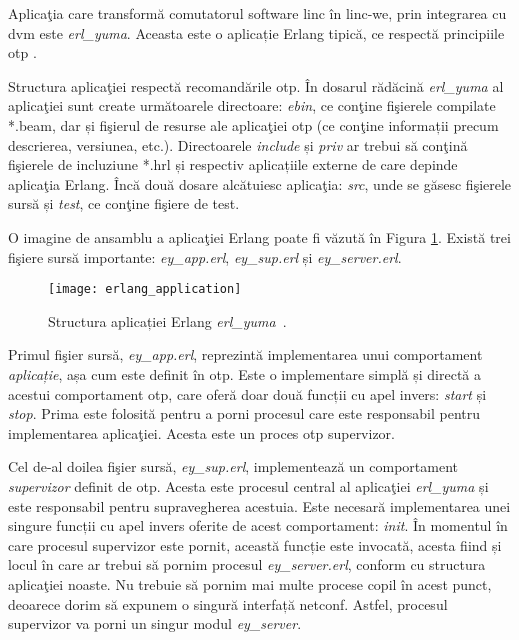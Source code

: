 Aplicaţia care transformă comutatorul software \gls{linc} în \gls{linc-we}, prin integrarea cu \gls{dvm} este \textit{erl\_yuma}. Aceasta este o aplicație Erlang tipică, ce respectă principiile \gls{otp} \cite{logan2010erlang}.

Structura aplicaţiei respectă recomandările \gls{otp}. În dosarul rădăcină \textit{erl\_yuma} al aplicaţiei sunt create următoarele directoare: \textit{ebin}, ce conţine fişierele compilate *.beam, dar și fişierul de resurse ale aplicaţiei \gls{otp} (ce conţine informații precum descrierea, versiunea, etc.). Directoarele \textit{include} și \textit{priv} ar trebui să conţină fişierele de incluziune *.hrl și respectiv aplicațiile externe de care depinde aplicaţia Erlang. Încă două dosare alcătuiesc aplicaţia: \textit{src}, unde se găsesc fişierele sursă și \textit{test}, ce conţine fişiere de test.

O imagine de ansamblu a aplicaţiei Erlang poate fi văzută în Figura \ref{fig:erlang_application}. Există trei fişiere sursă importante: \textit{ey\_app.erl}, \textit{ey\_sup.erl} și \textit{ey\_server.erl}.

\begin{figure}[h]
	\centering
	\texttt{[image: erlang\_application]}
	\caption{Structura aplicației Erlang \textit{erl\_yuma}~\cite{linc2014qsg}.}
	\label{fig:erlang_application}
\end{figure}

Primul fişier sursă, \textit{ey\_app.erl}, reprezintă implementarea unui comportament \textit{aplicație}, așa cum este definit în \gls{otp}. Este o implementare simplă și directă a acestui comportament \gls{otp}, care oferă doar două funcții cu apel invers: \textit{start} și \textit{stop}. Prima este folosită pentru a porni procesul care este responsabil pentru implementarea aplicaţiei. Acesta este un proces \gls{otp} supervizor.

Cel de-al doilea fişier sursă, \textit{ey\_sup.erl}, implementează un comportament \textit{supervizor} definit de \gls{otp}. Acesta este procesul central al aplicaţiei \textit{erl\_yuma} și este responsabil pentru supravegherea acestuia. Este necesară implementarea unei singure funcții cu apel invers oferite de acest comportament: \textit{init}. În momentul în care procesul supervizor este pornit, această funcție este invocată, acesta fiind și locul în care ar trebui să pornim procesul \textit{ey\_server.erl}, conform cu structura aplicaţiei noaste. Nu trebuie să pornim mai multe procese copil în acest punct, deoarece dorim să expunem o singură interfață \gls{netconf}. Astfel, procesul supervizor va porni un singur modul \textit{ey\_server}.

